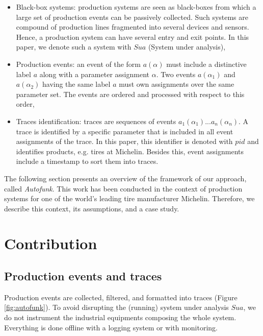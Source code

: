 \begin{itemize}
    \item Black-box systems: production systems are seen as
    black-boxes from which a large set of production events can
    be passively collected. Such systems are compound of
    production lines fragmented into several devices and sensors.
    Hence, a production system can have several entry and exit
    points. In this paper, we denote such a system with $Sua$
    (System under analysis),

    \item Production events: an event of the form $a(\alpha)$
    must include a distinctive label $a$ along with a parameter
    assignment $\alpha$. Two events $a(\alpha_1)$ and
    $a(\alpha_2)$ having the same label $a$ must own assignments
    over the same parameter set. The events are ordered and
    processed with respect to this order,

    \item Traces identification: traces are sequences of events
    $a_1(\alpha_1)$...$a_n(\alpha_n)$. A trace is identified by a
    specific parameter that is included in all event assignments
    of the trace. In this paper, this identifier is denoted with
    $pid$ and identifies products, e.g. tires at Michelin.
    Besides this, event assignments include a timestamp to sort
    them into traces.
\end{itemize}

The following section presents an overview of the framework of
our approach, called \textit{Autofunk}. This work has been
conducted in the context of production systems for one of the
world's leading tire manufacturer Michelin.  Therefore, we
describe this context, its assumptions, and a case study.


\section{Contribution}
\label{sec:modelinf:prodsystems}

\subsection{Production events and traces}
\label{part3:collecting}

Production events are collected, filtered, and formatted into
traces (Figure \ref{fig:autofunk}). To avoid disrupting the
(running) system under analysis $Sua$, we do not instrument the
industrial equipments composing the whole system. Everything is
done offline with a logging system or with monitoring.

